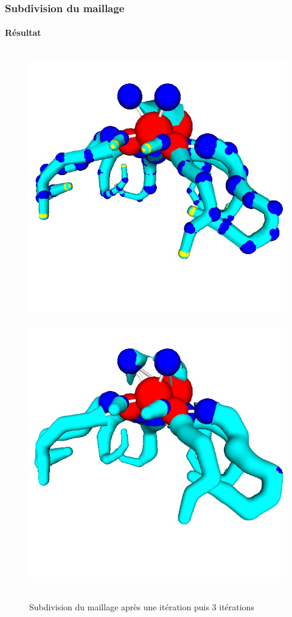 \documentclass[9pt]{beamer}
\begin{document}
\begin{frame}
	\frametitle{Subdivision du maillage}
	\framesubtitle{Résultat}
	
	\begin{figure}[H]
		\centering
		\leavevmode
  		\hbox{
  			\includegraphics[scale=0.3]{images/catmullclark.jpg}
  			\hspace*{0.5cm} 
     		\includegraphics[scale=0.3]{images/catmullclark3.jpg}
     		\hspace*{0.5cm}  
  		}
  		\caption{Subdivision du maillage après une itération puis 3 itérations}
	\end{figure}
\end{frame}
\end{document}

